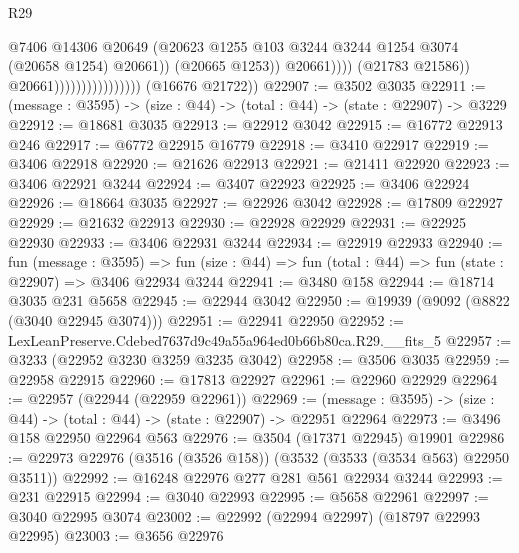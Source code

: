 \begin{lexlean}{R29}
\begin{coremodule}
                                                    @7406
                                                    @14306
                                                    @20649
                                                    (@20623
                                                      @1255
                                                      @103
                                                      @3244
                                                      @3244
                                                      @1254
                                                      @3074
                                                      (@20658 @1254)
                                                      @20661))
                                                  (@20665 @1253))
                                                @20661))))
                                        (@21783 @21586))
                                      @20661))))))))))))))))
      (@16676 @21722))
@22907 := @3502 @3035
@22911 := (message : @3595) -> (size : @44) -> (total : @44) -> (state : @22907) -> @3229
@22912 := @18681 @3035
@22913 := @22912 @3042
@22915 := @16772 @22913 @246
@22917 := @6772 @22915 @16779
@22918 := @3410 @22917
@22919 := @3406 @22918
@22920 := @21626 @22913
@22921 := @21411 @22920
@22923 := @3406 @22921 @3244
@22924 := @3407 @22923
@22925 := @3406 @22924
@22926 := @18664 @3035
@22927 := @22926 @3042
@22928 := @17809 @22927
@22929 := @21632 @22913
@22930 := @22928 @22929
@22931 := @22925 @22930
@22933 := @3406 @22931 @3244
@22934 := @22919 @22933
@22940 := fun (message : @3595) =>
  fun (size : @44) => fun (total : @44) => fun (state : @22907) => @3406 @22934 @3244
@22941 := @3480 @158
@22944 := @18714 @3035 @231 @5658
@22945 := @22944 @3042
@22950 := @19939 (@9092 (@8822 (@3040 @22945 @3074)))
@22951 := @22941 @22950
@22952 := LexLeanPreserve.Cdebed7637d9c49a55a964ed0b66b80ca.R29.__fits_5
@22957 := @3233 (@22952 @3230 @3259 @3235 @3042)
@22958 := @3506 @3035
@22959 := @22958 @22915
@22960 := @17813 @22927
@22961 := @22960 @22929
@22964 := @22957 (@22944 (@22959 @22961))
@22969 := (message : @3595) -> (size : @44) -> (total : @44) -> (state : @22907) -> @22951 @22964
@22973 := @3496 @158 @22950 @22964 @563
@22976 := @3504 (@17371 @22945) @19901
@22986 := @22973 @22976 (@3516 (@3526 @158)) (@3532 (@3533 (@3534 @563) @22950 @3511))
@22992 := @16248 @22976 @277 @281 @561 @22934 @3244
@22993 := @231 @22915
@22994 := @3040 @22993
@22995 := @5658 @22961
@22997 := @3040 @22995 @3074
@23002 := @22992 (@22994 @22997) (@18797 @22993 @22995)
@23003 := @3656 @22976

\end{coremodule}
\end{lexlean}
